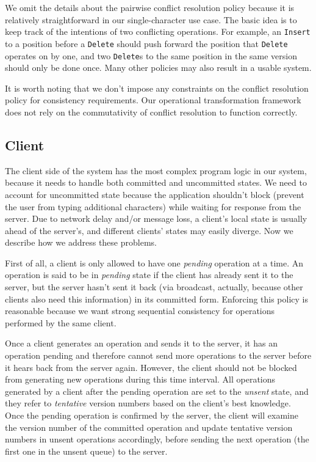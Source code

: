 We omit the details about the pairwise conflict resolution policy because it is
relatively straightforward in our single-character use case. The basic idea is
to keep track of the intentions of two conflicting operations. For example, an
{\tt Insert} to a position before a {\tt Delete} should push forward the
position that {\tt Delete} operates on by one, and two {\tt Delete}s to the same
position in the same version should only be done once. Many other policies may
also result in a usable system.

It is worth noting that we don't impose any constraints on the conflict
resolution policy for consistency requirements. Our operational transformation
framework does not rely on the commutativity of conflict resolution to function
correctly.

\subsection{Client}
\label{sec:design_client}

The client side of the system has the most complex program logic in our system,
because it needs to handle both committed and uncommitted states. We need to
account for uncommitted state because the application shouldn't block (prevent
the user from typing additional characters) while waiting for response from the
server. Due to network delay and/or message loss, a client's local state is
usually ahead of the server's, and different clients' states may easily diverge.
Now we describe how we address these problems.

First of all, a client is only allowed to have one {\em pending} operation at a
time. An operation is said to be in {\em pending} state if the client has
already sent it to the server, but the server hasn't sent it back (via
broadcast, actually, because other clients also need this information) in its
committed form. Enforcing this policy is reasonable because we want strong
sequential consistency for operations performed by the same client.

Once a client generates an operation and sends it to the server, it has an
operation pending and therefore cannot send more operations to the server before
it hears back from the server again. However, the client should not be blocked
from generating new operations during this time interval. All operations
generated by a client after the pending operation are set to the {\em unsent}
state, and they refer to {\em tentative} version numbers based on the client's
best knowledge. Once the pending operation is confirmed by the server, the
client will examine the version number of the committed operation and update
tentative version numbers in unsent operations accordingly, before sending the
next operation (the first one in the unsent queue) to the server.

